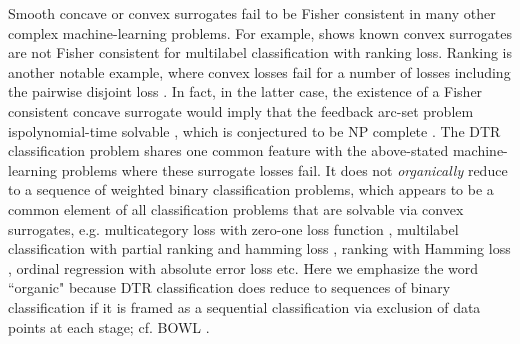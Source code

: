 \documentclass[preprint] {imsart}
\begin{document}
Smooth concave or convex surrogates  fail to be Fisher consistent in many other complex machine-learning problems.
 For example, \cite{gao2011} shows known convex surrogates are not Fisher consistent  for multilabel classification with ranking loss. 
Ranking is another notable example, where convex losses fail for a number of losses including the pairwise disjoint loss \citep{calauzenes2012}. In fact, in the latter case, the existence of a Fisher consistent concave surrogate  would imply that the feedback arc-set problem  ispolynomial-time solvable \citep{duchi2010}, which is conjectured to be NP complete \citep{karp1972}.  The DTR classification problem shares one common feature with 
  the above-stated  machine-learning problems where these surrogate losses fail. It does not \emph{organically} reduce to a sequence of weighted binary classification problems, which appears to be a common element  of all  classification problems that are solvable via convex surrogates, e.g. multicategory loss with zero-one loss function \citep{tewari2007}, multilabel classification with partial ranking and hamming loss \citep{gao2011}, ranking with Hamming loss \citep{calauzenes2012}, ordinal regression with absolute error loss \citep{pedregosa2017} etc. Here we emphasize the word ``organic" because DTR classification does reduce to sequences of binary classification if it is framed as a sequential classification via  exclusion of data points at each stage; cf. BOWL  \citep{zhao2015}.
 
\end{document}
